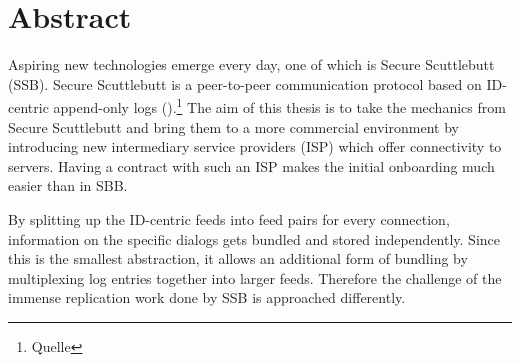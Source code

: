 \chapter{Abstract}
Aspiring new technologies emerge every day, one of which is Secure Scuttlebutt (SSB). Secure Scuttlebutt is a peer-to-peer communication protocol based on ID-centric append-only logs (\citet{tarr2019secure}).\footnote{Quelle} The aim of this thesis is to take the mechanics from Secure Scuttlebutt and bring them to a more commercial environment by introducing new intermediary service providers (ISP) which offer connectivity to servers. Having a contract with such an ISP makes the initial onboarding much easier than in SBB. 

By splitting up the ID-centric feeds into feed pairs for every connection, information on the specific dialogs gets bundled and stored independently. Since this is the smallest abstraction, it allows an additional form of bundling by multiplexing log entries together into larger feeds. Therefore the challenge of the immense replication work done by SSB is approached differently. 
